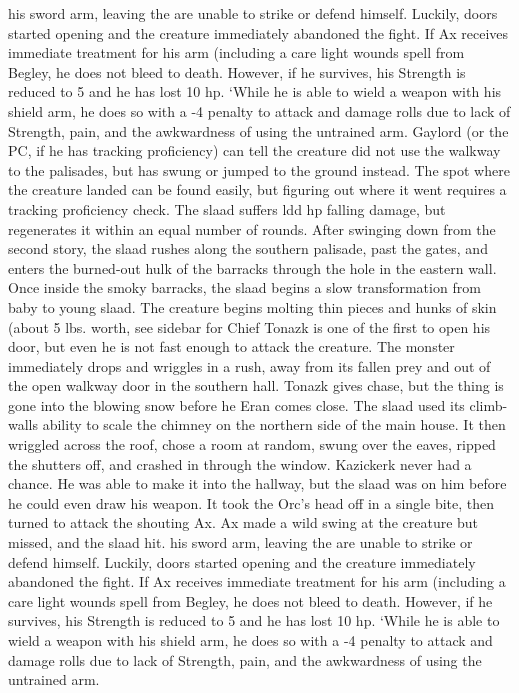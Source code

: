 \documentclass[a5paper,11pt,twoside]{book}
\begin{document}
{{{{{his sword arm, leaving the are unable to strike or defend himself.
Luckily, doors started opening and the creature immediately abandoned the fight.
 If Ax receives immediate treatment for his arm (including a care light wounds spell from Begley}, he does not bleed to death.
However, if he survives, his Strength is reduced to 5 and he has lost 10 hp.
‘While he is able to wield a weapon with his shield arm, he does so with a -4 penalty to attack and damage rolls due to lack of Strength, pain, and the awkwardness of using the untrained arm.
Gaylord (or the PC, if he has tracking proficiency) can tell the creature did not use the walkway to the palisades, but has swung or jumped to the ground instead.
The spot where the creature landed can be found easily, but figuring out where it went requires a tracking proficiency check.
The slaad suffers ldd hp falling damage, but regenerates it within an equal number of rounds.
After swinging down from the second story, the slaad rushes along the southern palisade, past the gates, and enters the burned-out hulk of the barracks through the hole in the eastern wall.
Once inside the smoky barracks, the slaad begins a slow transformation from baby to young slaad.
The creature begins molting thin pieces and hunks of skin (about 5 lbs.
worth, see sidebar for  Chief Tonazk is one of the first to open his door, but even he is not fast enough to attack the creature.
The monster immediately drops and wriggles in a rush, away from its fallen prey and out of the open walkway door in the southern hall.
Tonazk gives chase, but the thing is gone into the blowing snow before he Eran comes close.
 The slaad used its climb-walls ability to scale the chimney on the northern side of the main house.
It then wriggled across the roof, chose a room at random, swung over the eaves, ripped the shutters off, and crashed in through the window.
Kazickerk never had a chance.
He was able to make it into the hallway, but the slaad was on him before he could even draw his weapon.
It took the Orc’s head off in a single bite, then turned to attack the shouting Ax.
Ax made a wild swing at the creature but missed, and the slaad hit.
his sword arm, leaving the are unable to strike or defend himself.
Luckily, doors started opening and the creature immediately abandoned the fight.
 If Ax receives immediate treatment for his arm (including a care light wounds spell from Begley}, he does not bleed to death.
However, if he survives, his Strength is reduced to 5 and he has lost 10 hp.
‘While he is able to wield a weapon with his shield arm, he does so with a -4 penalty to attack and damage rolls due to lack of Strength, pain, and the awkwardness of using the untrained arm.
}}}
\end{document}
